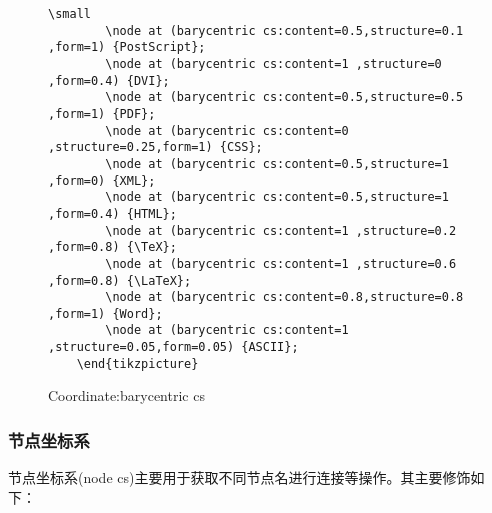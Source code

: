 \begin{figure}[H]
\begin{minipage}{0.8\linewidth}
\begin{lstlisting}[style = latex-side]
        \small
        \node at (barycentric cs:content=0.5,structure=0.1 ,form=1) {PostScript};
        \node at (barycentric cs:content=1 ,structure=0 ,form=0.4) {DVI};
        \node at (barycentric cs:content=0.5,structure=0.5 ,form=1) {PDF};
        \node at (barycentric cs:content=0 ,structure=0.25,form=1) {CSS};
        \node at (barycentric cs:content=0.5,structure=1 ,form=0) {XML};
        \node at (barycentric cs:content=0.5,structure=1 ,form=0.4) {HTML};
        \node at (barycentric cs:content=1 ,structure=0.2 ,form=0.8) {\TeX};
        \node at (barycentric cs:content=1 ,structure=0.6 ,form=0.8) {\LaTeX};
        \node at (barycentric cs:content=0.8,structure=0.8 ,form=1) {Word};
        \node at (barycentric cs:content=1 ,structure=0.05,form=0.05) {ASCII};
    \end{tikzpicture}
        \end{lstlisting}
    \end{minipage}
    \caption{Coordinate:barycentric cs}
\end{figure}

\subsubsection{节点坐标系}

节点坐标系(node cs)主要用于获取不同节点名进行连接等操作。其主要修饰如下：

